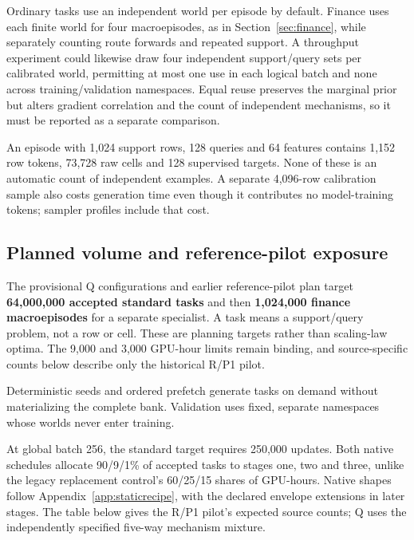 \documentclass[11pt]{article}
\begin{document}
Ordinary tasks use an independent world per episode by default. Finance uses each finite world for four macroepisodes, as in Section~\ref{sec:finance}, while separately counting route forwards and repeated support. A throughput experiment could likewise draw four independent support/query sets per calibrated world, permitting at most one use in each logical batch and none across training/validation namespaces. Equal reuse preserves the marginal prior but alters gradient correlation and the count of independent mechanisms, so it must be reported as a separate comparison.

An episode with 1,024 support rows, 128 queries and 64 features contains 1,152 row tokens, 73,728 raw cells and 128 supervised targets. None of these is an automatic count of independent examples. A separate 4,096-row calibration sample also costs generation time even though it contributes no model-training tokens; sampler profiles include that cost.


\subsection{Planned volume and reference-pilot exposure}
\label{sec:volume}

The provisional Q configurations and earlier reference-pilot plan target \textbf{64,000,000 accepted standard tasks} and then \textbf{1,024,000 finance macroepisodes} for a separate specialist. A task means a support/query problem, not a row or cell. These are planning targets rather than scaling-law optima. The 9,000 and 3,000 GPU-hour limits remain binding, and source-specific counts below describe only the historical R/P1 pilot.

Deterministic seeds and ordered prefetch generate tasks on demand without materializing the complete bank. Validation uses fixed, separate namespaces whose worlds never enter training.

At global batch 256, the standard target requires 250,000 updates. Both native schedules allocate 90/9/1\% of accepted tasks to stages one, two and three, unlike the legacy replacement control's 60/25/15 shares of GPU-hours. Native shapes follow Appendix~\ref{app:staticrecipe}, with the declared envelope extensions in later stages. The table below gives the R/P1 pilot's expected source counts; Q uses the independently specified five-way mechanism mixture.
\end{document}
